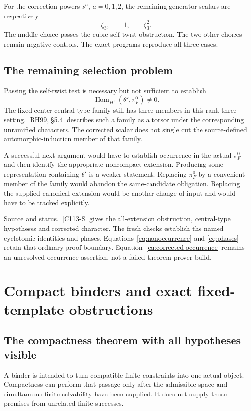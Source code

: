 \documentclass[11pt]{article}
\theoremstyle{definition}\newtheorem{definition}[proposition]{Definition}
\newcommand{\Hom}{\operatorname{Hom}}
\newcommand{\source}[1]{\par{\small\textsf{Source and status.}\ #1}\par}
\begin{document}
For the correction powers $\nu^a$, $a=0,1,2$, the remaining generator scalars are respectively
\[
 \zeta_3,\qquad1,\qquad\zeta_3^2.
 \tag{18.7}\label{eq:phases}
\]
The middle choice passes the cubic self-twist obstruction. The two other choices remain negative controls. The exact programs reproduce all three cases.

\subsection{The remaining selection problem}
Passing the self-twist test is necessary but not sufficient to establish
\[
 \Hom_{H^1}(\theta',\pi_F^0)\neq0.
 \tag{18.8}\label{eq:corrected-occurrence}
\]
The fixed-center central-type family still has three members in this rank-three setting. [BH99, \S5.4] describes such a family as a torsor under the corresponding unramified characters. The corrected scalar does not single out the source-defined automorphic-induction member of that family.

A successful next argument would have to establish occurrence in the actual $\pi_F^0$ and then identify the appropriate noncompact extension. Producing some representation containing $\theta'$ is a weaker statement. Replacing $\pi_F^0$ by a convenient member of the family would abandon the same-candidate obligation. Replacing the supplied canonical extension would be another change of input and would have to be tracked explicitly.

\source{[C113-S] gives the all-extension obstruction, central-type hypotheses and corrected character. The fresh checks establish the named cyclotomic identities and phases. Equations~\eqref{eq:nonoccurrence} and \eqref{eq:phases} retain that ordinary proof boundary. Equation~\eqref{eq:corrected-occurrence} remains an unresolved occurrence assertion, not a failed theorem-prover build.}

\section{Compact binders and exact fixed-template obstructions}\label{sec:binder}
\subsection{The compactness theorem with all hypotheses visible}
A binder is intended to turn compatible finite constraints into one actual object. Compactness can perform that passage only after the admissible space and simultaneous finite solvability have been supplied. It does not supply those premises from unrelated finite successes.
\end{document}
